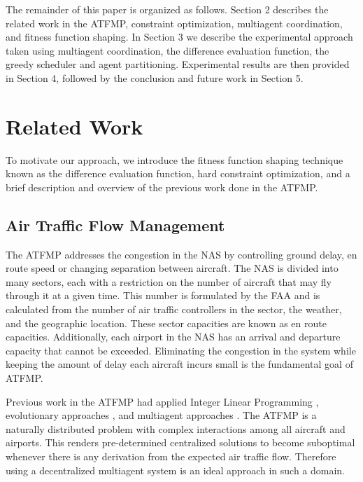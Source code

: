 \documentclass{sig-alternate}
\begin{document}
The remainder of this paper is organized as follows. Section 2 describes the related work in the ATFMP, constraint optimization, multiagent coordination, and fitness function shaping. In Section 3 we describe the experimental approach taken using multiagent coordination, the difference evaluation function, the greedy scheduler and agent partitioning. Experimental results are then provided in Section 4, followed by the conclusion and future work in Section 5.

\section{Related Work}
To motivate our approach, we introduce the fitness function shaping technique known as the difference evaluation function, hard constraint optimization, and a brief description and overview of the previous work done in the ATFMP.
  
\subsection{Air Traffic Flow Management}
The ATFMP addresses the congestion in the NAS by controlling ground delay, en route speed or changing separation between aircraft. The NAS is divided into many sectors, each with a restriction on the number of aircraft that may fly through it at a given time. This number is formulated by the FAA and is calculated from the number of air traffic controllers in the sector, the weather, and the geographic location. These sector capacities are known as en route capacities. Additionally, each airport in the NAS has an arrival and departure capacity that cannot be exceeded. Eliminating the congestion in the system while keeping the amount of delay each aircraft incurs small is the fundamental goal of ATFMP. 

Previous work in the ATFMP had applied Integer Linear Programming \cite{Bertsimas}, evolutionary approaches \cite{Rios}, and multiagent approaches \cite{tumer-agogino_jaamas12,664154, Sislak:2008:AMA:1402744.1402755}. The ATFMP is a naturally distributed problem with complex interactions among all aircraft and airports. This renders pre-determined centralized solutions to become suboptimal whenever there is any derivation from the expected air traffic flow. Therefore using a decentralized multiagent system is an ideal approach in such a domain.
\end{document}
